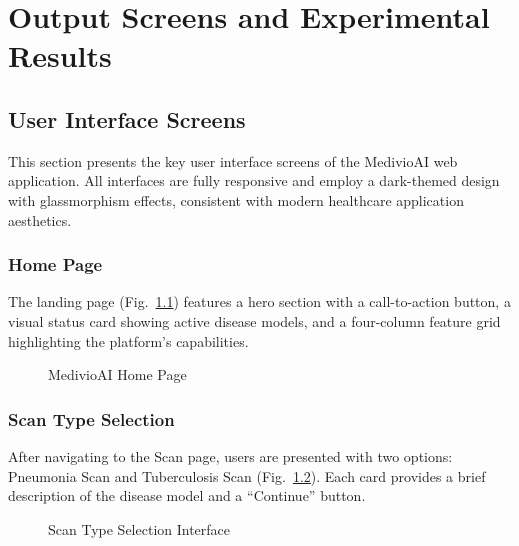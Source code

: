 \documentclass[12pt, a4paper, oneside]{report}
\begin{document}
\chapter{Output Screens and Experimental Results}
\label{chap:results}

\section{User Interface Screens}
\label{sec:ui_screens}

This section presents the key user interface screens of the MedivioAI web application. All interfaces are fully responsive and employ a dark-themed design with glassmorphism effects, consistent with modern healthcare application aesthetics.

\subsection{Home Page}

The landing page (Fig.~\ref{fig:homepage}) features a hero section with a call-to-action button, a visual status card showing active disease models, and a four-column feature grid highlighting the platform's capabilities.

\begin{figure}[H]
\centering
{}
\caption{MedivioAI Home Page}
\label{fig:homepage}
\end{figure}

\subsection{Scan Type Selection}

After navigating to the Scan page, users are presented with two options: Pneumonia Scan and Tuberculosis Scan (Fig.~\ref{fig:scan_select}). Each card provides a brief description of the disease model and a ``Continue'' button.

\begin{figure}[H]
\centering
{}
\caption{Scan Type Selection Interface}
\label{fig:scan_select}
\end{figure}
\end{document}
